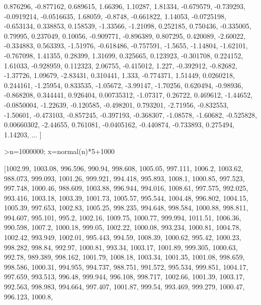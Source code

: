 \documentclass[a4paper,10pt]{article}
\begin{document}
\begin{eulernotebook}
\begin{eulercomment}
\begin{eulercomment}
\begin{euleroutput}
  0.876296,  -0.877162,  0.689615,  1.66396,  1.10287,  1.81334,
  -0.679579,  -0.739293,  -0.0919214,  -0.0516635,  1.68059,  -0.8748,
  -0.661822,  1.14053,  -0.0725198,  -0.653134,  0.338853,  0.158539,
  -1.33566,  -1.21098,  0.252185,  0.750436,  -0.335005,  0.79995,
  0.237049,  0.10056,  -0.909771,  -0.896389,  0.807295,  0.420089,
  -2.60022,  -0.334883,  0.563393,  -1.51976,  -0.618486,  -0.757591,
  -1.5655,  -1.14804,  -1.62101,  -0.767098,  1.41355,  0.28399,
  1.31699,  0.325665,  0.123923,  -0.301708,  0.224152,  1.61033,
  -0.928959,  0.112323,  2.06755,  -0.415012,  1.227,  -0.392912,
  -0.82682,  -1.37726,  1.09679,  -2.83431,  0.310441,  1.333,
  -0.774371,  1.51449,  0.0260218,  0.244161,  -1.25954,  0.833535,
  -1.05672,  -3.99147,  -1.70256,  0.620494,  -0.98936,  -0.868208,
  0.344441,  0.926404,  0.00735312,  -1.07317,  0.26722,  0.469612,
  -1.44652,  -0.0850004,  -1.22639,  -0.120585,  -0.498201,  0.793201,
  -2.71956,  -0.832553,  -1.50601,  -0.473103,  -0.857245,  -0.397193,
  -0.368307,  -1.08578,  -1.60682,  -0.525828,  0.00660302,  -2.44655,
  0.761081,  -0.0405162,  -0.440874,  -0.733893,  0.275494,  1.14203,
   ... ]
\end{euleroutput}
\begin{eulerprompt}
>n=1000000; x=normal(n)*5+1000
\end{eulerprompt}
\begin{euleroutput}
  [1002.99,  1003.08,  996.596,  990.94,  998.608,  1005.05,  997.111,
  1006.2,  1003.62,  988.073,  999.093,  1001.26,  999.921,  994.418,
  995.893,  1008.1,  1000.85,  997.523,  997.748,  1000.46,  988.609,
  1003.88,  996.944,  994.016,  1008.61,  997.575,  992.025,  993.416,
  1003.18,  1003.39,  1001.73,  1005.57,  995.544,  1004.48,  996.802,
  1004.15,  1005.39,  997.653,  1002.83,  1005.25,  998.235,  994.648,
  998.584,  1000.88,  998.811,  994.607,  995.101,  995.2,  1002.16,
  1009.75,  1000.77,  999.994,  1011.51,  1006.36,  990.598,  1007.2,
  1000.18,  999.05,  1002.22,  1000.08,  993.234,  1000.81,  1004.78,
  1002.42,  993.949,  1002.01,  995.443,  994.59,  1008.39,  1000.62,
  995.42,  1000.23,  998.282,  998.84,  992.97,  1000.81,  993.34,
  1003.17,  1001.89,  999.305,  1000.63,  992.78,  989.389,  998.162,
  1001.79,  1008.18,  1003.34,  1001.35,  1001.08,  998.659,  998.586,
  1000.31,  994.955,  994.737,  988.751,  991.572,  995.534,  999.851,
  1004.17,  997.659,  993.513,  996.48,  999.944,  996.108,  998.717,
  1002.66,  1001.39,  1003.17,  992.563,  998.983,  994.664,  997.407,
  1001.87,  999.54,  993.469,  999.279,  1000.47,  996.123,  1000.8,

\end{euleroutput}
\end{eulercomment}
\end{eulercomment}
\end{eulernotebook}
\end{document}
